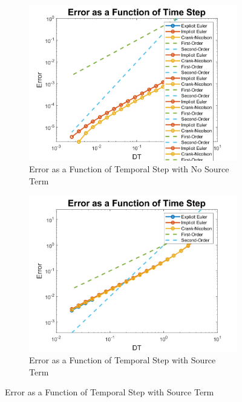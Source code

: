 \documentclass[10pt, letter, showtrims]{extarticle}
\begin{document}
		\FloatBarrier
		\begin{figure}[h]
		\captionsetup{justification=centering}
		\centering
			\begin{subfigure}{.45\textwidth}
				\centering
				\includegraphics[width=\linewidth]{"Figures/MATLAB/ConstantDXNoSource"}
				\caption{Error as a Function of Temporal Step with No Source Term}
				\label{fig:temporalnosource}
			\end{subfigure}
			\begin{subfigure}{.45\textwidth}
				\centering
				\includegraphics[width=\linewidth]{"Figures/MATLAB/ConstantDXSource"}
				\caption{Error as a Function of Temporal Step with Source Term}
				\label{fig:temporalsource}
			\end{subfigure}
		\label{fig:temporal}
		\end{figure}		
		\FloatBarrier
		
\end{document}
